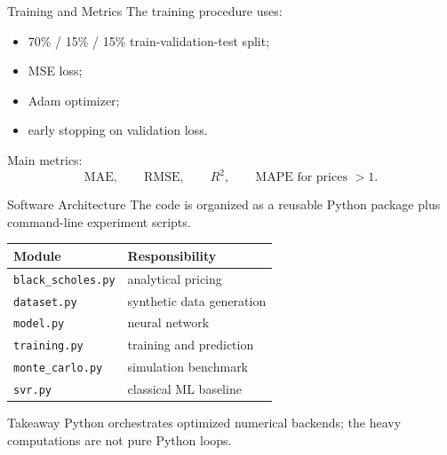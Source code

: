 \documentclass[10pt,aspectratio=43]{beamer}
\newcommand{\takeaway}[1]{%
    \begin{block}{Takeaway}
        #1
    \end{block}
}
\begin{document}
\begin{frame}{Training and Metrics}
    The training procedure uses:
    \begin{itemize}
        \item 70\% / 15\% / 15\% train-validation-test split;
        \item MSE loss;
        \item Adam optimizer;
        \item early stopping on validation loss.
    \end{itemize}

    Main metrics:
    \[
        \mathrm{MAE},\qquad
        \mathrm{RMSE},\qquad
        R^2,\qquad
        \mathrm{MAPE}\text{ for prices }>1.
    \]
\end{frame}


\begin{frame}{Software Architecture}
    The code is organized as a reusable Python package plus command-line experiment scripts.

    \begin{center}
        \scriptsize
        \begin{tabular}{ll}
            \toprule
            Module                     & Responsibility            \\
            \midrule
            \texttt{black\_scholes.py} & analytical pricing        \\
            \texttt{dataset.py}        & synthetic data generation \\
            \texttt{model.py}          & neural network            \\
            \texttt{training.py}       & training and prediction   \\
            \texttt{monte\_carlo.py}   & simulation benchmark      \\
            \texttt{svr.py}            & classical ML baseline     \\
            \bottomrule
        \end{tabular}
    \end{center}

    \takeaway{Python orchestrates optimized numerical backends; the heavy computations are not pure Python loops.}
\end{frame}
\end{document}
